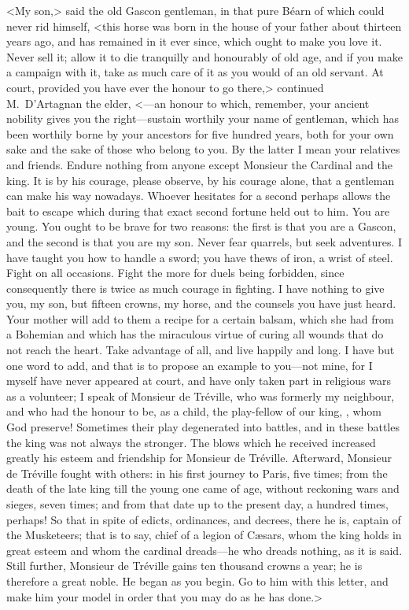 <My son,> said the old Gascon gentleman, in that pure Béarn  of which  could never rid himself, <this horse was born in the house of your father about thirteen years ago, and has remained in it ever since, which ought to make you love it. Never sell it; allow it to die tranquilly and honourably of old age, and if you make a campaign with it, take as much care of it as you would of an old servant. At court, provided you have ever the honour to go there,> continued M.~D'Artagnan the elder, <—an honour to which, remember, your ancient nobility gives you the right—sustain worthily your name of gentleman, which has been worthily borne by your ancestors for five hundred years, both for your own sake and the sake of those who belong to you. By the latter I mean your relatives and friends. Endure nothing from anyone except Monsieur the Cardinal and the king. It is by his courage, please observe, by his courage alone, that a gentleman can make his way nowadays. Whoever hesitates for a second perhaps allows the bait to escape which during that exact second fortune held out to him. You are young. You ought to be brave for two reasons: the first is that you are a Gascon, and the second is that you are my son. Never fear quarrels, but seek adventures. I have taught you how to handle a sword; you have thews of iron, a wrist of steel. Fight on all occasions. Fight the more for duels being forbidden, since consequently there is twice as much courage in fighting. I have nothing to give you, my son, but fifteen crowns, my horse, and the counsels you have just heard. Your mother will add to them a recipe for a certain balsam, which she had from a Bohemian and which has the miraculous virtue of curing all wounds that do not reach the heart. Take advantage of all, and live happily and long. I have but one word to add, and that is to propose an example to you—not mine, for I myself have never appeared at court, and have only taken part in religious wars as a volunteer; I speak of Monsieur de Tréville, who was formerly my neighbour, and who had the honour to be, as a child, the play-fellow of our king, , whom God preserve! Sometimes their play degenerated into battles, and in these battles the king was not always the stronger. The blows which he received increased greatly his esteem and friendship for Monsieur de Tréville. Afterward, Monsieur de Tréville fought with others: in his first journey to Paris, five times; from the death of the late king till the young one came of age, without reckoning wars and sieges, seven times; and from that date up to the present day, a hundred times, perhaps! So that in spite of edicts, ordinances, and decrees, there he is, captain of the Musketeers; that is to say, chief of a legion of Cæsars, whom the king holds in great esteem and whom the cardinal dreads—he who dreads nothing, as it is said. Still further, Monsieur de Tréville gains ten thousand crowns a year; he is therefore a great noble. He began as you begin. Go to him with this letter, and make him your model in order that you may do as he has done.> 

